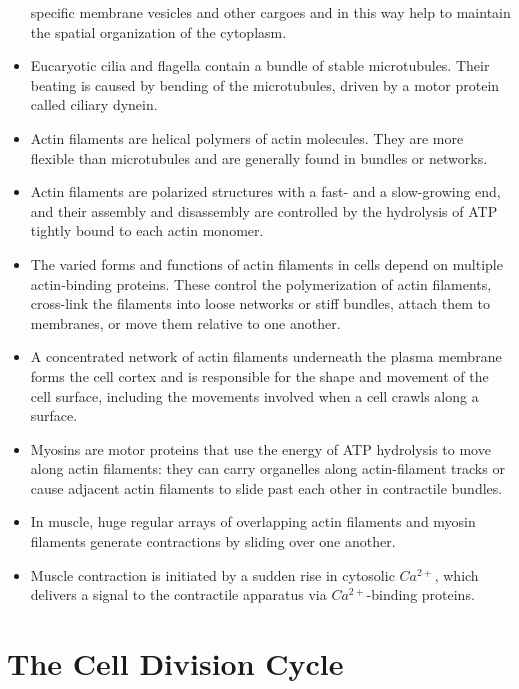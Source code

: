 \begin{itemize}
specific membrane vesicles and other cargoes and in this way help to
maintain the spatial organization of the cytoplasm.
\item Eucaryotic cilia and flagella contain a bundle of stable microtubules.
Their beating is caused by bending of the microtubules, driven by a
motor protein called ciliary dynein.
\item Actin filaments are helical polymers of actin molecules. They are
more flexible than microtubules and are generally found in bundles
or networks.
\item Actin filaments are polarized structures with a fast- and a slow-growing
end, and their assembly and disassembly are controlled by the
hydrolysis of ATP tightly bound to each actin monomer.
\item The varied forms and functions of actin filaments in cells depend on
multiple actin-binding proteins. These control the polymerization of
actin filaments, cross-link the filaments into loose networks or stiff
bundles, attach them to membranes, or move them relative to one
another.
\item A concentrated network of actin filaments underneath the plasma
membrane forms the cell cortex and is responsible for the shape and
movement of the cell surface, including the movements involved
when a cell crawls along a surface.
\item Myosins are motor proteins that use the energy of ATP hydrolysis to
move along actin filaments: they can carry organelles along actin-filament
tracks or cause adjacent actin filaments to slide past each
other in contractile bundles.
\item In muscle, huge regular arrays of overlapping actin filaments and
myosin filaments generate contractions by sliding over one another.
\item Muscle contraction is initiated by a sudden rise in cytosolic $Ca^{2+}$,
which delivers a signal to the contractile apparatus via $Ca^{2+}$-binding
proteins.
\end{itemize}

\chapter{The Cell Division Cycle}




































